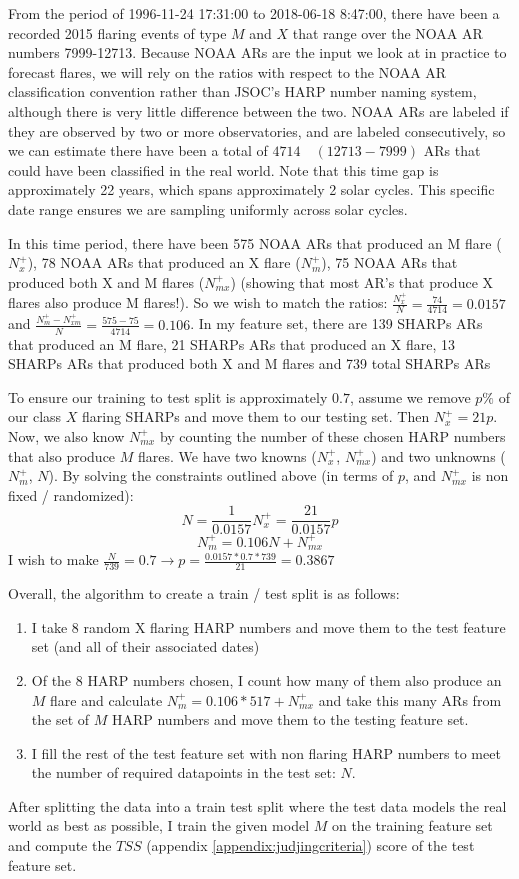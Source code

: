\documentclass[defaultstyle,11pt]{thesis}
\begin{document}
From the period of 1996-11-24 17:31:00 to 2018-06-18 8:47:00, there have been a recorded 2015 flaring events of type $M$ and $X$ that range over the NOAA AR numbers 7999-12713. Because NOAA ARs are the input we look at in practice to forecast flares, we will rely on the ratios with respect to the NOAA AR classification convention rather than JSOC's HARP number naming system, although there is very little difference between the two. NOAA ARs are labeled if they are observed by two or more observatories, and are labeled consecutively, so we can estimate there have been a total of $4714 \quad (12713 - 7999)$ ARs that could have been classified in the real world. Note that this time gap is approximately 22 years, which spans approximately 2 solar cycles. This specific date range ensures we are sampling uniformly across solar cycles.

In this time period, there have been 575 NOAA ARs that produced an M flare ($N_x^+$), 78 NOAA ARs that produced an X flare ($N_m^+$), 75 NOAA ARs that produced both X and M flares ($N_{mx}^+$) (showing that most AR's that produce X flares also produce M flares!). So we wish to match the ratios: $\frac{N_x^+}{N} = \frac{74}{4714} = 0.0157$ and $\frac{N_m^+ - N_{xm}^+}{N} = \frac{575 - 75}{4714} = 0.106$. In my feature set, there are 139 SHARPs ARs that produced an M flare, 21 SHARPs ARs that produced an X flare, 13 SHARPs ARs that produced both X and M flares and 739 total SHARPs ARs

To ensure our training to test split is approximately $0.7$, assume we remove $p\%$ of our class $X$ flaring SHARPs and move them to our testing set. Then $N_{x}^+ = 21p$. Now, we also know $N_{mx}^+$ by counting the number of these chosen HARP numbers that also produce $M$ flares. We have two knowns ($N_x^+$, $N_{mx}^+$) and two unknowns ($N_m^+$, $N$). By solving the constraints outlined above (in terms of $p$, and $N_{mx}^+$ is non fixed / randomized):
$$N = \frac{1}{0.0157}N_x^+=\frac{21}{0.0157}p$$
$$N_{m}^+ = 0.106N + N_{mx}^+$$
I wish to make $\frac{N}{739} = 0.7 \rightarrow p = \frac{0.0157*0.7*739}{21} = 0.3867$

Overall, the algorithm to create a train / test split is as follows:
\begin{enumerate}
    \item I take $8$ random X flaring HARP numbers and move them to the test feature set (and all of their associated dates)
    \item Of the $8$ HARP numbers chosen, I count how many of them also produce an $M$ flare and calculate $N_{m}^+ = 0.106*517 + N_{mx}^+$ and take this many ARs from the set of $M$ HARP numbers and move them to the testing feature set.
    \item I fill the rest of the test feature set with non flaring HARP numbers to meet the number of required datapoints in the test set: $N$.
\end{enumerate}
After splitting the data into a train test split where the test data models the real world as best as possible, I train the given model $M$ on the training feature set and compute the $TSS$ (appendix \ref{appendix:judjingcriteria}) score of the test feature set. 
\end{document}
